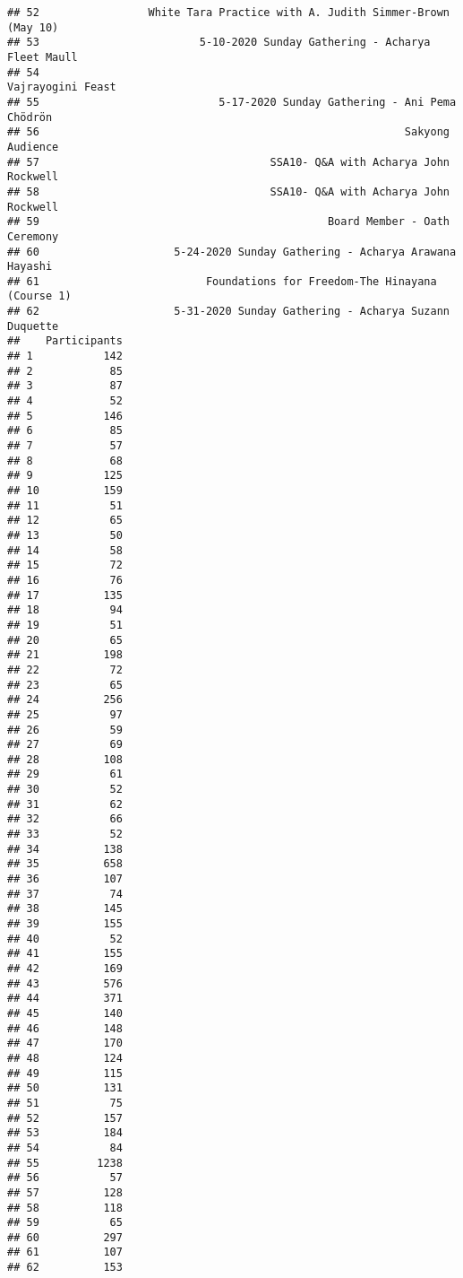 \documentclass[
]{article}
\begin{document}
\begin{verbatim}
## 52                 White Tara Practice with A. Judith Simmer-Brown (May 10)
## 53                         5-10-2020 Sunday Gathering - Acharya Fleet Maull
## 54                                                        Vajrayogini Feast
## 55                            5-17-2020 Sunday Gathering - Ani Pema Chödrön
## 56                                                         Sakyong Audience
## 57                                    SSA10- Q&A with Acharya John Rockwell
## 58                                    SSA10- Q&A with Acharya John Rockwell
## 59                                             Board Member - Oath Ceremony
## 60                     5-24-2020 Sunday Gathering - Acharya Arawana Hayashi
## 61                          Foundations for Freedom-The Hinayana (Course 1)
## 62                     5-31-2020 Sunday Gathering - Acharya Suzann Duquette
##    Participants
## 1           142
## 2            85
## 3            87
## 4            52
## 5           146
## 6            85
## 7            57
## 8            68
## 9           125
## 10          159
## 11           51
## 12           65
## 13           50
## 14           58
## 15           72
## 16           76
## 17          135
## 18           94
## 19           51
## 20           65
## 21          198
## 22           72
## 23           65
## 24          256
## 25           97
## 26           59
## 27           69
## 28          108
## 29           61
## 30           52
## 31           62
## 32           66
## 33           52
## 34          138
## 35          658
## 36          107
## 37           74
## 38          145
## 39          155
## 40           52
## 41          155
## 42          169
## 43          576
## 44          371
## 45          140
## 46          148
## 47          170
## 48          124
## 49          115
## 50          131
## 51           75
## 52          157
## 53          184
## 54           84
## 55         1238
## 56           57
## 57          128
## 58          118
## 59           65
## 60          297
## 61          107
## 62          153
\end{verbatim}
\end{document}
